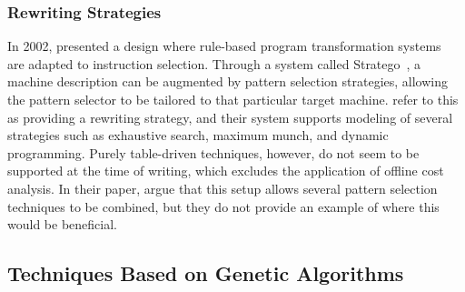 {\subsubsection{Rewriting Strategies}

In 2002, \citeauthor{Bravenboer2002} presented a design where \gls{rule}-based
\gls{program} transformation systems~\cite{Visser2005} are adapted to
\gls{instruction selection}.
%
Through a system called
\gls{Stratego}~\cite{Visser2001}, a \gls{machine description} can be augmented
by \gls{pattern selection} strategies, allowing the \gls{pattern selector} to be
tailored to that particular \gls{target machine}.
%
\citeauthor{Bravenboer2002}
refer to this as providing a \gls{rewriting strategy}, and their system supports
modeling of several strategies such as exhaustive search, \gls{maximum munch},
and dynamic programming.
%
Purely table-driven techniques, however, do not seem to
be supported at the time of writing, which excludes the application of
\gls{offline cost analysis}.
%
In their paper, \citeauthor{Bravenboer2002} argue
that this setup allows several \gls{pattern selection} techniques to be
combined, but they do not provide an example of where this would be beneficial.


\subsection{Techniques Based on Genetic Algorithms}

}

